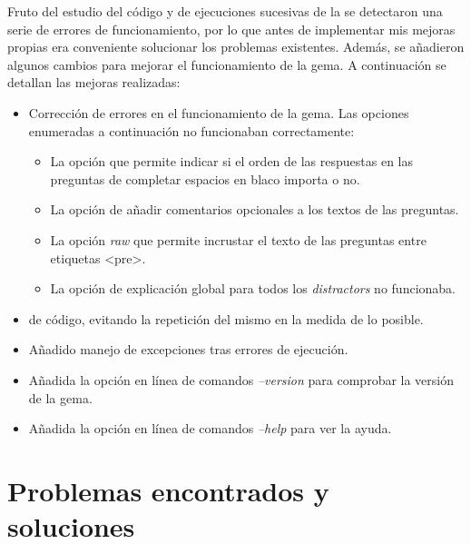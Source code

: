 

Fruto del estudio del c\'odigo y de ejecuciones sucesivas de la  se detectaron una serie de errores de funcionamiento,
por lo que antes de implementar mis mejoras propias era conveniente solucionar los problemas existentes.
Adem\'as, se a\~{n}adieron algunos cambios para mejorar el funcionamiento de la gema. A continuaci\'on se detallan las mejoras
realizadas:

\begin{itemize}
  \item Correcci\'on de errores en el funcionamiento de la gema. Las opciones enumeradas a continuaci\'on no funcionaban correctamente:
  \begin{itemize}
    \item La opci\'on que permite indicar si el orden de las respuestas en las preguntas de completar espacios en blaco importa o no.
    \item La opci\'on de a\~{n}adir comentarios opcionales a los textos de las preguntas.
    \item La opci\'on \textit{raw} que permite incrustar el texto de las preguntas entre etiquetas \textless pre\textgreater \space {}.
    \item La opci\'on de explicaci\'on global para todos los \textit{distractors} no funcionaba.
  \end{itemize}
  \item {} de c\'odigo, evitando la repetici\'on del mismo en la medida de lo posible.
  \item A\~{n}adido manejo de excepciones tras errores de ejecuci\'on.
  \item A\~{n}adida la opci\'on en l\'inea de comandos \textit{--version} para comprobar la versi\'on de la gema. 
  \item A\~{n}adida la opci\'on en l\'inea de comandos \textit{--help} para ver la ayuda. 
\end{itemize}
\bigskip

\section{Problemas encontrados y soluciones}
\label{3:sec:1}

